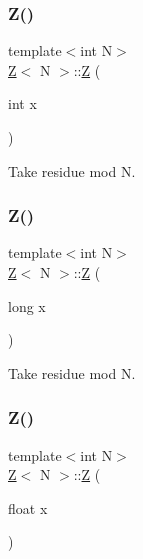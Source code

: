 \subsubsection{\texorpdfstring{Z()}{Z()}\hspace{0.1cm}{\footnotesize\ttfamily [2/4]}}
{\footnotesize\ttfamily template$<$int N$>$ \\
\hyperlink{classZ}{Z}$<$ N $>$\+::\hyperlink{classZ}{Z} (\begin{DoxyParamCaption}\item[{int}]{x }\end{DoxyParamCaption})\hspace{0.3cm}{\ttfamily [inline]}}



Take residue mod N. 

\mbox{\label{classZ_a55fa70d38bc723f35e27139239bf385a}} 
\subsubsection{\texorpdfstring{Z()}{Z()}\hspace{0.1cm}{\footnotesize\ttfamily [3/4]}}
{\footnotesize\ttfamily template$<$int N$>$ \\
\hyperlink{classZ}{Z}$<$ N $>$\+::\hyperlink{classZ}{Z} (\begin{DoxyParamCaption}\item[{long}]{x }\end{DoxyParamCaption})\hspace{0.3cm}{\ttfamily [inline]}}



Take residue mod N. 

\mbox{\label{classZ_a32b7b05c9f2e161d1b9fc60dd1e7a27b}} 
\subsubsection{\texorpdfstring{Z()}{Z()}\hspace{0.1cm}{\footnotesize\ttfamily [4/4]}}
{\footnotesize\ttfamily template$<$int N$>$ \\
\hyperlink{classZ}{Z}$<$ N $>$\+::\hyperlink{classZ}{Z} (\begin{DoxyParamCaption}\item[{float}]{x }\end{DoxyParamCaption})\hspace{0.3cm}{\ttfamily [inline]}}



